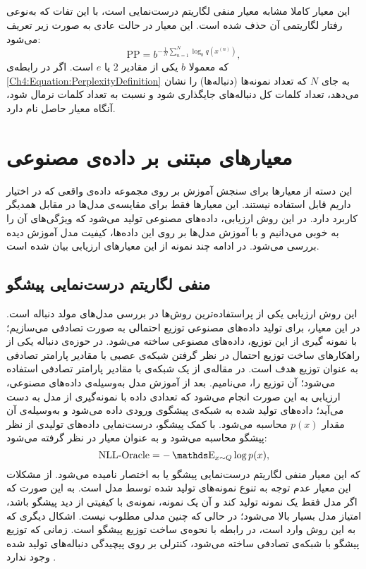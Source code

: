 \subsection{}\label{Metric:PPModel}
این معیار کاملا مشابه معیار منفی لگاریتم درست‌نمایی است، با این تفات که به‌نوعی رفتار لگاریتمی آن حذف شده است. این معیار در حالت عادی به صورت زیر تعریف می‌شود:
		\begin{equation}\label{Ch4:Equation:PerplexityDefinition}
		\text{PP} = b^{- \frac{1}{N} \sum_{n=1}^N \log_b  q(x^{(n)})},
		\end{equation}
		که معمولا $b$ یکی از مقادیر $2$ یا $e$ است.
		\newline
		اگر در رابطه‌ی 
		\ref{Ch4:Equation:PerplexityDefinition}
		به جای $N$ که تعداد نمونه‌ها (دنباله‌ها) را نشان می‌دهد، تعداد کلمات کل دنباله‌های جایگذاری شود و نسبت به تعداد کلمات نرمال شود، آنگاه معیار حاصل
		نام دارد.
\section{معیارهای مبتنی بر داده‌ی مصنوعی  }
این دسته از معیارها برای سنجش آموزش بر روی مجموعه داده‌ی واقعی که در اختیار داریم قابل استفاده نیستند. این معیارها فقط برای مقایسه‌ی مدل‌ها در مقابل همدیگر کاربرد دارد. در این روش ارزیابی، داده‌های مصنوعی تولید می‌شود که ویژگی‌های آن را به خوبی می‌دانیم و با آموزش مدل‌ها بر روی این داده‌ها، کیفیت مدل آموزش دیده بررسی می‌شود. در ادامه چند نمونه از این معیار‌های ارزیابی بیان شده است.
\subsection{منفی لگاریتم درست‌نمایی پیشگو}\label{Metric:NLLOracle}
این روش ارزیابی یکی از پراستفاده‌ترین روش‌ها در بررسی مدل‌های مولد دنباله است.
در این معیار، برای تولید داده‌های مصنوعی توزیع احتمالی به صورت تصادفی می‌سازیم؛ با نمونه گیری از این توزیع، داده‌های مصنوعی ساخته می‌شود. در حوزه‌ی دنباله یکی از راهکارهای ساخت توزیع احتمال در نظر گرفتن شبکه‌ی عصبی با مقادیر پارامتر تصادفی به عنوان توزیع هدف است. در مقاله‌ی 
\cite{SeqGAN}
از یک شبکه‌ی
با مقادیر پارامتر تصادفی استفاده می‌شود؛ آن توزیع را،
می‌نامیم.
بعد از آموزش مدل به‌وسیله‌ی داده‌های مصنوعی، ارزیابی به این صورت انجام می‌شود که تعدادی داده‌ با نمونه‌گیری از مدل به دست می‌آید؛ داده‌های تولید شده به شبکه‌ی پیشگوی ورودی داده می‌شود و به‌وسیله‌ی آن مقدار 
$p(x)$
محاسبه می‌شود. با کمک پیشگو، درست‌نمایی داده‌های تولیدی از نظر پیشگو محاسبه می‌شود و به عنوان معیار در نظر گرفته می‌شود:
\begin{equation}
\text{NLL-Oracle} = - \ME_{x \sim Q} \log p(x),
\end{equation}
که این معیار منفی لگاریتم درست‌نمایی پیشگو یا به اختصار
نامیده می‌شود.
\newline
از مشکلات این  معیار عدم توجه به تنوع نمونه‌های تولید شده توسط مدل است. به این صورت که اگر مدل فقط یک نمونه تولید کند و آن یک نمونه، نمونه‌ی با کیفیتی از دید پیشگو باشد، امتیاز مدل بسیار بالا می‌شود؛ در حالی که چنین مدلی مطلوب نیست.
اشکال دیگری که به این روش وارد است، در رابطه با نحوه‌ی ساخت توزیع پیشگو است. زمانی که توزیع پیشگو با شبکه‌ی
تصادفی ساخته می‌شود، کنترلی بر روی پیچیدگی دنباله‌های تولید شده وجود ندارد
\cite{subramanian2017adversarial}.

